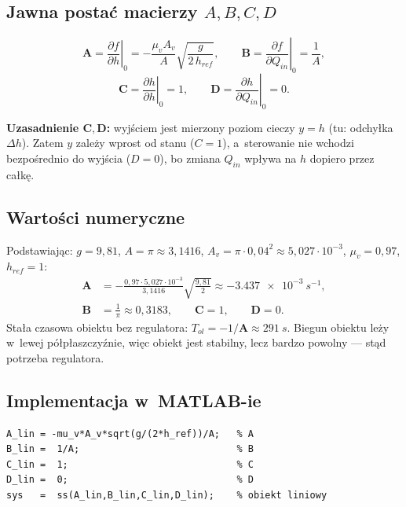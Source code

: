 \documentclass[11pt,a4paper]{article}
\begin{document}
\subsection{Jawna postać macierzy \texorpdfstring{$A,B,C,D$}{A,B,C,D}}

\begin{wzor}
\begin{equation}
\mathbf A = \left.\frac{\partial f}{\partial h}\right|_{0}
= -\frac{\mu_v A_v}{A}\sqrt{\frac{g}{2\,h_{ref}}},\qquad
\mathbf B = \left.\frac{\partial f}{\partial Q_{in}}\right|_{0} = \frac{1}{A},
\end{equation}
\begin{equation}
\mathbf C = \left.\frac{\partial h}{\partial h}\right|_{0} = 1,\qquad
\mathbf D = \left.\frac{\partial h}{\partial Q_{in}}\right|_{0} = 0.
\end{equation}
\end{wzor}

\noindent\textbf{Uzasadnienie $\mathbf C,\mathbf D$:} wyjściem jest mierzony
poziom cieczy $y=h$ (tu: odchyłka $\Delta h$). Zatem $y$ zależy wprost od
stanu ($C=1$), a~sterowanie nie wchodzi bezpośrednio do wyjścia ($D=0$), bo
zmiana $Q_{in}$ wpływa na $h$ dopiero przez całkę.

\subsection{Wartości numeryczne}

Podstawiając: $g=9{,}81$, $A=\pi\approx 3{,}1416$, $A_v=\pi\cdot 0{,}04^{2}
\approx 5{,}027\cdot 10^{-3}$, $\mu_v = 0{,}97$, $h_{ref}=1$:
\begin{align}
\mathbf A &= -\frac{0{,}97\cdot 5{,}027\!\cdot\! 10^{-3}}{3{,}1416}
             \sqrt{\tfrac{9{,}81}{2}}
           \approx -\SI{3.437e-3}{s^{-1}}, \\
\mathbf B &= \tfrac{1}{\pi} \approx 0{,}3183, \qquad
\mathbf C = 1,\qquad
\mathbf D = 0.
\end{align}
Stała czasowa obiektu bez regulatora: $T_{ol} = -1/\mathbf A \approx \SI{291}{s}$.
Biegun obiektu leży w~lewej półpłaszczyźnie, więc obiekt jest stabilny,
lecz bardzo powolny --- stąd potrzeba regulatora.

\subsection{Implementacja w~MATLAB-ie}

\begin{lstlisting}[style=matlab]
A_lin = -mu_v*A_v*sqrt(g/(2*h_ref))/A;   % A
B_lin =  1/A;                            % B
C_lin =  1;                              % C
D_lin =  0;                              % D
sys   =  ss(A_lin,B_lin,C_lin,D_lin);    % obiekt liniowy
\end{lstlisting}
\end{document}
